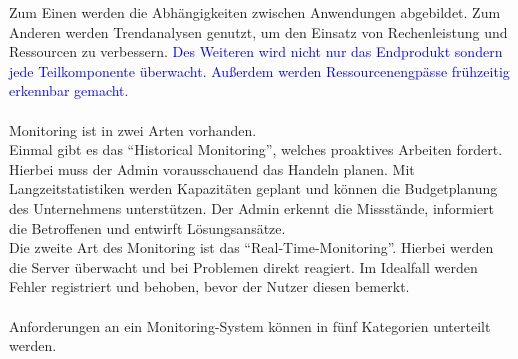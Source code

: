 Zum Einen werden die Abhängigkeiten zwischen Anwendungen abgebildet.
Zum Anderen werden Trendanalysen genutzt, um den Einsatz von Rechenleistung und Ressourcen zu verbessern.
\textcolor{blue}{Des Weiteren wird nicht nur das Endprodukt sondern jede Teilkomponente überwacht.
Außerdem werden Ressourcenengpässe frühzeitig erkennbar gemacht.}\autocite{wbs, cloudradar}
\\
\\
Monitoring ist in zwei Arten vorhanden.
\\
Einmal gibt es das \enquote{Historical Monitoring}, welches proaktives Arbeiten fordert.
Hierbei muss der Admin vorausschauend das Handeln planen.
Mit Langzeitstatistiken werden Kapazitäten geplant und können die Budgetplanung des Unternehmens unterstützen.
Der Admin erkennt die Missstände, informiert die Betroffenen und entwirft Lösungsansätze.
\\
Die zweite Art des Monitoring ist das \enquote{Real-Time-Monitoring}.
Hierbei werden die Server überwacht und bei Problemen direkt reagiert.
Im Idealfall werden Fehler registriert und behoben, bevor der Nutzer diesen bemerkt.\autocite{crossmedia}
\\
\\
Anforderungen an ein Monitoring-System können in fünf Kategorien unterteilt werden.
\\
